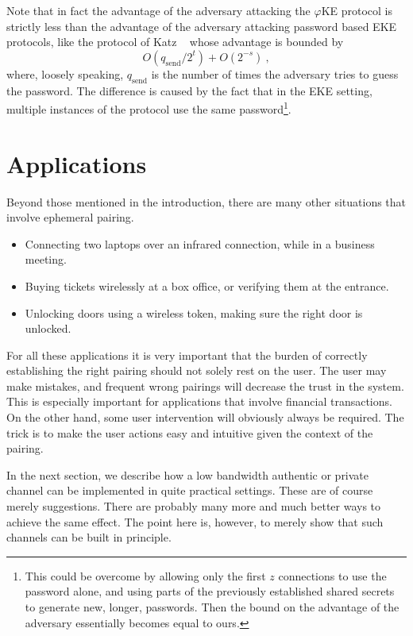 \documentclass[runningheads,envcountsame,envcountsect,oribibl]{llncs}
\newcommand{\eke}{$\varphi$KE}
\newcommand{\sps}{t}
\newcommand{\spl}{s}
\begin{document}
Note that in fact the advantage of the adversary attacking the \eke{} protocol
is strictly less than the advantage of the adversary attacking password based
EKE protocols, like the protocol of Katz \etal~\cite{KatOY01} whose
advantage is bounded by 
\[ 
   O(q_{\text{send}} / 2^\sps) + O(2^{-\spl})~,
\]
where, loosely speaking, $q_{\text{send}}$ is the number of times the adversary
tries to guess the password. The difference is caused by the fact that in the
EKE setting, multiple instances of the protocol use the same 
password\footnote{
  This could be overcome by allowing only the first $z$ connections to use the
  password alone, and using parts of the previously established shared secrets
  to generate new, longer, passwords. Then the bound on the advantage of the
  adversary essentially becomes equal to ours.
}.



\section{Applications}
\label{sec-appl}

Beyond those mentioned in the introduction, there are many other situations
that involve ephemeral pairing. 
\begin{itemize}
\item Connecting two  laptops over an infrared connection, while in a business
  meeting.  
\item Buying tickets wirelessly at a box office, or verifying them at the
  entrance. 
\item Unlocking doors using a wireless token, making sure the right door is
  unlocked. 
\end{itemize}
For all these applications it is very important that the burden of correctly
establishing the right pairing should not solely rest on the user. The user may
make mistakes, and frequent wrong pairings will decrease the trust in the
system. This is especially important for applications that involve financial
transactions. On the other hand, some user intervention will obviously always
be required. The trick is to make the user actions easy and intuitive given the
context of the pairing.

In the next section, we describe how a low bandwidth authentic or
private channel can be implemented in quite practical settings. These are of
course merely suggestions. There are probably many more and much better ways to
achieve the same effect. The point here is, however, to merely show that such
channels can be built in principle.
\end{document}
